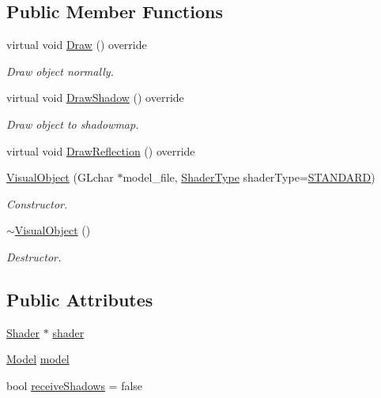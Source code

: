 \subsection*{Public Member Functions}
\begin{DoxyCompactItemize}
\item 
virtual void \mbox{\hyperlink{class_visual_object_a10c0e01e375fd4af08e57f3475dd312c}{Draw}} () override
\begin{DoxyCompactList}\small\item\em Draw object normally. \end{DoxyCompactList}\item 
virtual void \mbox{\hyperlink{class_visual_object_a88e778dc97ad93cefd5193d6899d6c82}{Draw\+Shadow}} () override
\begin{DoxyCompactList}\small\item\em Draw object to shadowmap. \end{DoxyCompactList}\item 
virtual void \mbox{\hyperlink{class_visual_object_afaf21bc843280f7f8ebf52ab7d71ac2d}{Draw\+Reflection}} () override
\item 
\mbox{\hyperlink{class_visual_object_acae4022cf0fa793dfba4ea5a91b9d242}{Visual\+Object}} (G\+Lchar $\ast$model\+\_\+file, \mbox{\hyperlink{_game_object_8h_a6230e1b9ecbf2d82d10856fd7e1fde46}{Shader\+Type}} shader\+Type=\mbox{\hyperlink{_texture_8h_a65468556d79304b3a4bfc464cc12e549a94e94133f4bdc1794c6b647b8ea134d0}{S\+T\+A\+N\+D\+A\+RD}})
\begin{DoxyCompactList}\small\item\em Constructor. \end{DoxyCompactList}\item 
\mbox{\hyperlink{class_visual_object_a068ba11545322d81d9ad8c675c4233f9}{$\sim$\+Visual\+Object}} ()
\begin{DoxyCompactList}\small\item\em Destructor. \end{DoxyCompactList}\end{DoxyCompactItemize}
\subsection*{Public Attributes}
\begin{DoxyCompactItemize}
\item 
\mbox{\hyperlink{class_shader}{Shader}} $\ast$ \mbox{\hyperlink{class_visual_object_a6d00e06796983b19f57d6fd86b202902}{shader}}
\item 
\mbox{\hyperlink{class_model}{Model}} \mbox{\hyperlink{class_visual_object_a325fec77ff1a5441f1ff4ffa98e508c8}{model}}
\item 
bool \mbox{\hyperlink{class_visual_object_af54b3c823b3ca24736faeedc88ef90f3}{receive\+Shadows}} = false
\end{DoxyCompactItemize}


